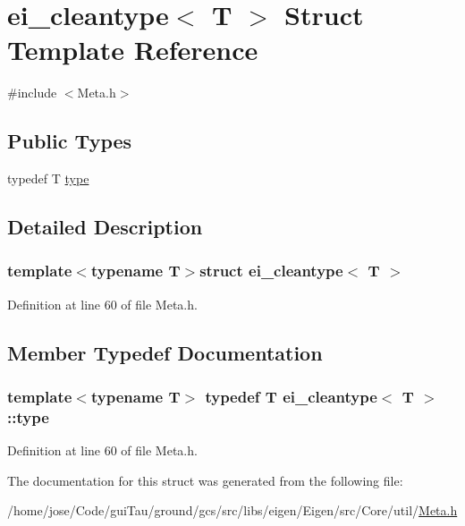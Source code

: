 \hypertarget{structei__cleantype}{\section{ei\-\_\-cleantype$<$ T $>$ Struct Template Reference}
\label{structei__cleantype}
}


{\ttfamily \#include $<$Meta.\-h$>$}

\subsection*{Public Types}
\begin{DoxyCompactItemize}
\item 
typedef T \hyperlink{structei__cleantype_acb88654a010f9ee104acd859e3b2f687}{type}
\end{DoxyCompactItemize}


\subsection{Detailed Description}
\subsubsection*{template$<$typename T$>$struct ei\-\_\-cleantype$<$ T $>$}



Definition at line 60 of file Meta.\-h.



\subsection{Member Typedef Documentation}
\hypertarget{structei__cleantype_acb88654a010f9ee104acd859e3b2f687}{
\subsubsection[{type}]{\setlength{\rightskip}{0pt plus 5cm}template$<$typename T$>$ typedef T {\bf ei\-\_\-cleantype}$<$ T $>$\-::{\bf type}}}\label{structei__cleantype_acb88654a010f9ee104acd859e3b2f687}


Definition at line 60 of file Meta.\-h.



The documentation for this struct was generated from the following file\-:\begin{DoxyCompactItemize}
\item 
/home/jose/\-Code/gui\-Tau/ground/gcs/src/libs/eigen/\-Eigen/src/\-Core/util/\hyperlink{_meta_8h}{Meta.\-h}\end{DoxyCompactItemize}
